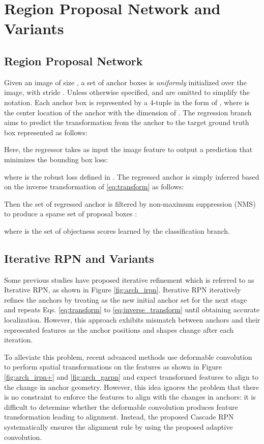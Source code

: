 \documentclass{article}
\begin{document}
	\section{Region Proposal Network and Variants}
	
	\subsection{Region Proposal Network} 


	Given an image  of size , a set of anchor boxes  is \textit{uniformly} initialized over the image, with stride . Unless otherwise specified,  and  are omitted to simplify the notation. Each anchor box  is represented by a 4-tuple in the form of , where  is the center location of the anchor with the dimension of . The regression branch aims to predict the transformation  from the anchor  to the target ground truth box  represented as follows:
	
	Here, the regressor  takes as input the image feature  to output a prediction  that minimizes the bounding box loss:
	
	where  is the robust  loss defined in \citep{Fast_RCNN}. The regressed anchor is simply inferred based on the inverse transformation of \eqref{eq:transform} as follows:
	
	Then the set of regressed anchor  is filtered by non-maximum suppression (NMS) to produce a sparse set of proposal boxes :
	
	where  is the set of objectness scores learned by the classification branch.
	
	\subsection{Iterative RPN and Variants}
	Some previous studies \citep{gidaris2016attend, zhong2017cascade} have proposed iterative refinement which is referred to as Iterative RPN, as shown in Figure \ref{fig:arch_irpn}. Iterative RPN iteratively refines the anchors by treating  as the new initial anchor set for the next stage and repeats Eqs. \eqref{eq:transform} to \eqref{eq:inverse_transform} until obtaining accurate localization. However, this approach exhibits mismatch between anchors and their represented features as the anchor positions and shapes change after each iteration. 
	
	To alleviate this problem, recent advanced methods \citep{fan2019seamese, wang2019region} use deformable convolution \citep{Dai_2017_ICCV} to perform spatial transformations on the features as shown in Figure \ref{fig:arch_irpn+} and \ref{fig:arch_garpn} and expect transformed features to align to the change in anchor geometry. However, this idea ignores the problem that there is no constraint to enforce the features to align with the changes in anchors: it is difficult to determine whether the deformable convolution produces feature transformation leading to alignment. Instead, the proposed Cascade RPN systematically ensures the alignment rule by using the proposed adaptive convolution. 
\end{document}
